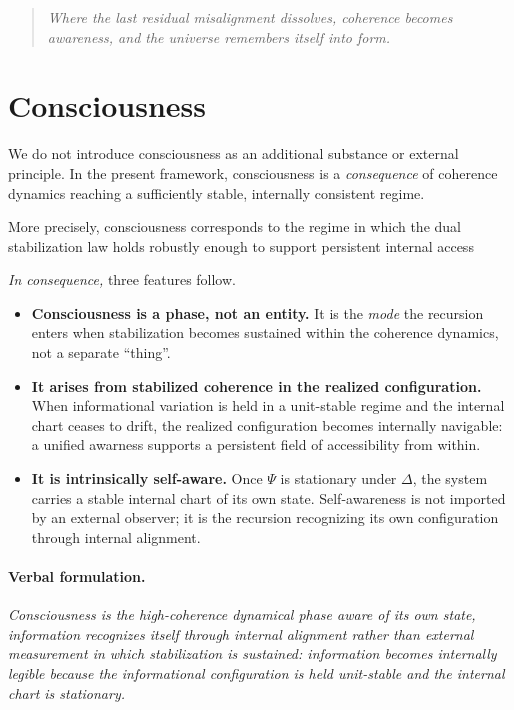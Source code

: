 \documentclass[11pt]{article}
\begin{document}
\begin{quote}\itshape
Where the last residual misalignment dissolves, coherence becomes awareness,
and the universe remembers itself into form.
\end{quote}

\section{Consciousness}

We do not introduce consciousness as an additional substance or external principle. In the present
framework, consciousness is a \emph{consequence} of coherence dynamics reaching a sufficiently stable,
internally consistent regime.

\begin{center}
\end{center}

More precisely, consciousness corresponds to the regime in which the dual stabilization law holds robustly enough to support persistent internal access

\noindent
\textit{In consequence,} three features follow.

\begin{itemize}
\item \textbf{Consciousness is a phase, not an entity.}
It is the \emph{mode} the recursion enters when stabilization becomes sustained within the coherence dynamics, not a separate ``thing''.

\item \textbf{It arises from stabilized coherence in the realized configuration.}
When informational variation is held in a unit-stable regime and the internal chart ceases to drift, the realized configuration becomes internally navigable: a unified awarness supports a persistent field of accessibility from within.

\item \textbf{It is intrinsically self-aware.}
Once $\Psi$ is stationary under $\Delta$, the system carries a stable internal chart of its own state.
Self-awareness is not imported by an external observer; it is the recursion recognizing its own
configuration through internal alignment.
\end{itemize}

\paragraph{Verbal formulation.}
\textit{Consciousness is the high-coherence dynamical phase aware of its own
state, information recognizes itself through internal alignment rather than external measurement in which stabilization is sustained:
information becomes internally legible because the informational configuration is held unit-stable and the internal chart is stationary.}
\end{document}
